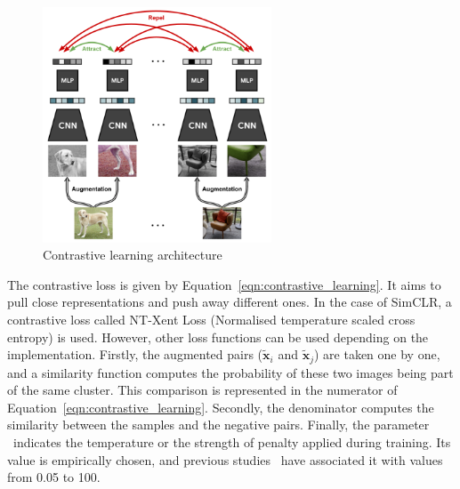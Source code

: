 \documentclass[12pt]{article}
\begin{document}
\begin{figure}[ht]
\centering
\includegraphics[height=7cm]{res/contrastive_learning}
\caption{\label{figure:contrastive_learning}Contrastive learning architecture~\citep{ashish2020}}
\end{figure}

The contrastive loss is given by Equation~\ref{eqn:contrastive_learning}. It aims to pull close representations and push away different ones. In the case of SimCLR, a contrastive loss called NT-Xent Loss (Normalised temperature scaled cross entropy) is used. However, other loss functions can be used depending on the implementation. Firstly, the augmented pairs ($\tilde{\boldsymbol{x}}_i$ and $\tilde{\boldsymbol{x}}_j$) are taken one by one, and a similarity function computes the probability of these two images being part of the same cluster. This comparison is represented in the numerator of Equation~\ref{eqn:contrastive_learning}. Secondly, the denominator computes the similarity between the samples and the negative pairs. Finally, the parameter \texttau~indicates the temperature or the strength of penalty applied during training. Its value is empirically chosen, and previous studies~\citep{chen2020,caron2020} have associated it with values from 0.05 to 100. %
\end{document}
